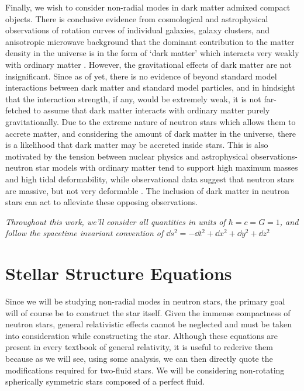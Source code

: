 \documentclass[a4paper,12pt,onehalfspacing]{report}
\newcommand\emptypage{
    \newpage
    \null
    \thispagestyle{empty}
    }
\begin{document}
Finally, we wish to consider non-radial modes in dark matter admixed compact objects. There is conclusive evidence from cosmological and astrophysical observations of rotation curves of individual galaxies, galaxy clusters, and anisotropic microwave background that the dominant contribution to the matter density in the universe is in the form of `dark matter' which interacts very weakly with ordinary matter \cite{bertoneParticleDarkMatter2005}. However, the gravitational effects of dark matter are not insignificant. Since as of yet, there is no evidence of beyond standard model interactions between dark matter and standard model particles, and in hindsight that the interaction strength, if any, would be extremely weak, it is not far-fetched to assume that dark matter interacts with ordinary matter purely gravitationally. Due to the extreme nature of neutron stars which allows them to accrete matter, and considering the amount of dark matter in the universe, there is a likelihood that dark matter may be accreted inside stars. This is also motivated by the tension between nuclear physics and astrophysical observations- neutron star models with ordinary matter tend to support high maximum masses and high tidal deformability, while observational data suggest that neutron stars are massive, but not very deformable \cite{ciancarellaConstrainingMirrorDark2021}. The inclusion of dark matter in neutron stars can act to alleviate these opposing observations. 

\emph{Throughout this work, we'll consider all quantities in units of $\hbar=c=G=1$, and follow the spacetime invariant convention of $\dd s^2= -\dd t^2+ \dd x^2+ \dd y^2+ \dd z^2$}

\emptypage
\chapter{Stellar Structure Equations}

Since we will be studying non-radial modes in neutron stars, the primary goal will of course be to construct the star itself. Given the immense compactness of neutron stars, general relativistic effects cannot be neglected and must be taken into consideration while constructing the star. Although these equations are present in every textbook of general relativity, it is useful to rederive them because as we will see, using some analysis, we can then directly quote the modifications required for two-fluid stars. We will be considering non-rotating spherically symmetric stars composed of a perfect fluid.
\end{document}
